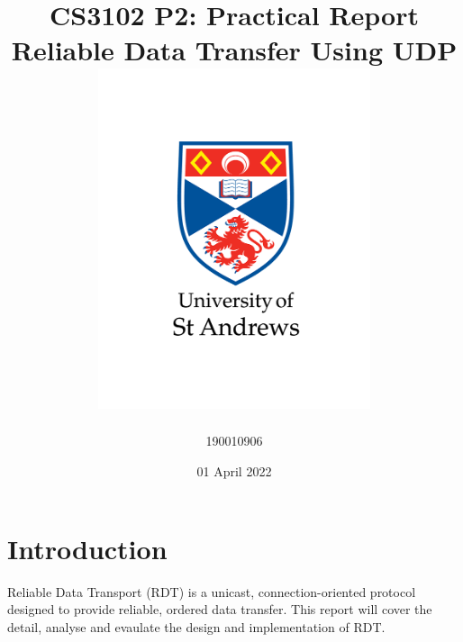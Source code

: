 \documentclass[12pt]{article}
\title{
{CS3102 P2: Practical Report}\\
{\large Reliable Data Transfer Using UDP}\\
{\includegraphics[width=80mm]{images/university-logo.png}}
}
\author{190010906}
\date{01 April 2022}
\begin{document}
\maketitle

\newpage

\section{Introduction}

Reliable Data Transport (RDT) is a unicast, connection-oriented protocol designed to provide reliable, ordered data transfer. This report will cover the detail, analyse and evaulate the design and implementation of RDT.











\theendnotes
\newpage



\newpage

\end{document}

